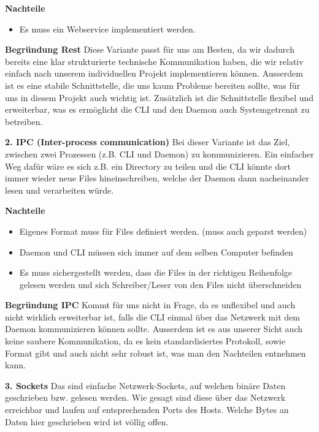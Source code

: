 \documentclass[a4paper,12pt]{report}
\begin{document}
    \textbf{Nachteile}
    \begin{itemize}
        \item Es muss ein Webservice implementiert werden.
    \end{itemize}

    \textbf{Begründung Rest} Diese Variante passt für uns am Besten, da wir dadurch bereits eine klar strukturierte technische
    Kommunikation haben, die wir relativ einfach nach unserem individuellen Projekt implementieren können.
    Ausserdem ist es eine stabile Schnittstelle, die uns kaum Probleme bereiten sollte, was für uns in diesem Projekt auch wichtig ist.
    Zusätzlich ist die Schnittstelle flexibel und erweiterbar, was es ermöglicht die CLI und den Daemon auch Systemgetrennt zu betreiben.

    \textbf{2. IPC (Inter-process communication)}
    Bei dieser Variante ist das Ziel, zwischen zwei Prozessen (z.B. CLI und Daemon) zu kommunizieren.
    Ein einfacher Weg dafür wäre es sich z.B. ein Directory zu teilen und die CLI könnte dort immer wieder neue Files hineinschreiben,
    welche der Daemon dann nacheinander lesen und verarbeiten würde.

    \textbf{Nachteile}
    \begin{itemize}
        \item Eigenes Format muss für Files definiert werden.
        (muss auch geparst werden)
        \item Daemon und CLI müssen sich immer auf dem selben Computer befinden
        \item Es muss sichergestellt werden, dass die Files in der richtigen Reihenfolge gelesen werden und sich
        Schreiber/Leser von den Files nicht überschneiden
    \end{itemize}

    \textbf{Begründung IPC} Kommt für uns nicht in Frage, da es unflexibel und auch nicht wirklich erweiterbar ist,
    falls die CLI einmal über das Netzwerk mit dem Daemon kommunizieren können sollte.
    Ausserdem ist es aus unserer Sicht auch keine saubere Kommunikation, da es kein standardisiertes Protokoll,
    sowie Format gibt und auch nicht sehr robust ist, was man den Nachteilen entnehmen kann.

    \textbf{3. Sockets}
    Das sind einfache Netzwerk-Sockets, auf welchen binäre Daten geschrieben bzw. gelesen werden.
    Wie gesagt sind diese über das Netzwerk erreichbar und laufen auf entsprechenden Ports des Hosts.
    Welche Bytes an Daten hier geschrieben wird ist völlig offen.
\end{document}
